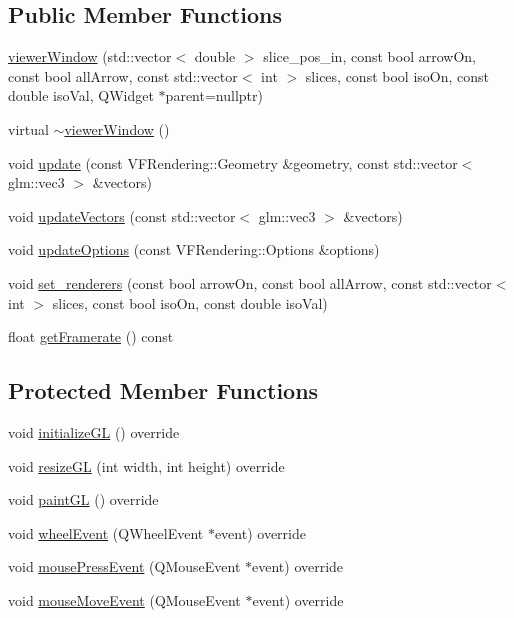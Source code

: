 \subsection*{Public Member Functions}
\begin{DoxyCompactItemize}
\item 
\hyperlink{classnMagWindows_1_1viewerWindow_a700e4bca76465101c5404ed3511af38f}{viewer\+Window} (std\+::vector$<$ double $>$ slice\+\_\+pos\+\_\+in, const bool arrow\+On, const bool all\+Arrow, const std\+::vector$<$ int $>$ slices, const bool iso\+On, const double iso\+Val, Q\+Widget $\ast$parent=nullptr)
\item 
virtual \hyperlink{classnMagWindows_1_1viewerWindow_abc66dbe51c1fd662eafcb14466382655}{$\sim$viewer\+Window} ()
\item 
void \hyperlink{classnMagWindows_1_1viewerWindow_a91e38c0e40f40aa4219c7b9bccfdca21}{update} (const V\+F\+Rendering\+::\+Geometry \&geometry, const std\+::vector$<$ glm\+::vec3 $>$ \&vectors)
\item 
void \hyperlink{classnMagWindows_1_1viewerWindow_aa93ecd1a2bc515804cc5780902111206}{update\+Vectors} (const std\+::vector$<$ glm\+::vec3 $>$ \&vectors)
\item 
void \hyperlink{classnMagWindows_1_1viewerWindow_ad3c57658a50c31f5680ca0149f4ed700}{update\+Options} (const V\+F\+Rendering\+::\+Options \&options)
\item 
void \hyperlink{classnMagWindows_1_1viewerWindow_a9336f6f66088169a5a4ce979755427ba}{set\+\_\+renderers} (const bool arrow\+On, const bool all\+Arrow, const std\+::vector$<$ int $>$ slices, const bool iso\+On, const double iso\+Val)
\item 
float \hyperlink{classnMagWindows_1_1viewerWindow_a8d1bdb9fd44982e2f82716a70bc5fb05}{get\+Framerate} () const 
\end{DoxyCompactItemize}
\subsection*{Protected Member Functions}
\begin{DoxyCompactItemize}
\item 
void \hyperlink{classnMagWindows_1_1viewerWindow_a38e32a190bcd85e1a78fbf13c2e5bf2f}{initialize\+GL} () override
\item 
void \hyperlink{classnMagWindows_1_1viewerWindow_affcbcf6e86f76f64d4492372ebcc0aca}{resize\+GL} (int width, int height) override
\item 
void \hyperlink{classnMagWindows_1_1viewerWindow_a4dc51c39e4bb00f9622efb4a2683ce94}{paint\+GL} () override
\item 
void \hyperlink{classnMagWindows_1_1viewerWindow_a5ec1c19ffa3287dfece38f7db63c80ec}{wheel\+Event} (Q\+Wheel\+Event $\ast$event) override
\item 
void \hyperlink{classnMagWindows_1_1viewerWindow_ab10703ac3a707a6b813862255b606b51}{mouse\+Press\+Event} (Q\+Mouse\+Event $\ast$event) override
\item 
void \hyperlink{classnMagWindows_1_1viewerWindow_ae844f52b23024f772a8175aa1fa395d7}{mouse\+Move\+Event} (Q\+Mouse\+Event $\ast$event) override
\end{DoxyCompactItemize}


